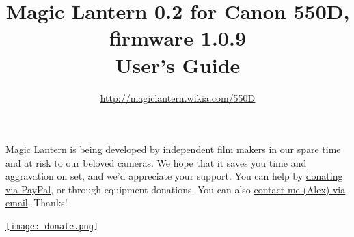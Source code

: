 \documentclass[a4paper,english]{article}
\begin{document}
\title{Magic Lantern 0.2 for Canon 550D, firmware 1.0.9\\User's Guide}
\author{\url{http://magiclantern.wikia.com/550D}}
\maketitle

\vspace{5mm}
\begin{center}

\begin{minipage}{13cm}

\end{minipage}
\vspace{5mm}

\begin{minipage}{13cm}
Magic Lantern is being developed by independent film makers in our spare time and at risk to our beloved cameras. We hope that it saves you time and aggravation on set, and we'd appreciate your support. You can help by \href{https://www.paypal.com/cgi-bin/webscr?cmd=_donations&business=ELJ6U9GGFPL3U&lc=RO&item_name=Magic%20Lantern%20firmware%20for%20Canon%20550D&currency_code=EUR&bn=PP%2dDonationsBF%3abtn_donate_LG%2egif%3aNonHostedGuest}{donating via PayPal}, or through equipment donations. You can also \href{mailto:broscutamaker@gmail.com}{contact me (Alex) via email}. Thanks!

\vspace{2mm}
\hskip1mm \href{https://www.paypal.com/cgi-bin/webscr?cmd=_donations&business=ELJ6U9GGFPL3U&lc=RO&item_name=Magic%20Lantern%20firmware%20for%20Canon%20550D&currency_code=EUR&bn=PP%2dDonationsBF%3abtn_donate_LG%2egif%3aNonHostedGuest}{\texttt{[image: donate.png]}}
\end{minipage}
\end{center}


\newpage
\end{document}
